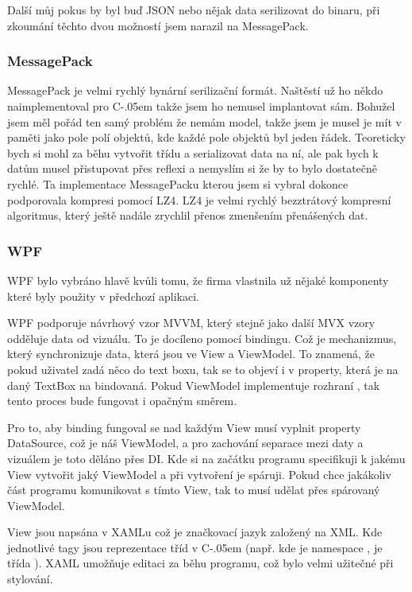 \documentclass[czech,bachelor,dept460,male,csharp]{diploma}
\newcommand{\Csharp}{%
  {\settoheight{\dimen0}{C}C\kern-.05em \resizebox{!}{\dimen0}{\raisebox{\depth}{\#}}}}
\begin{document}
			Další můj pokus by byl buď JSON nebo nějak data serilizovat do binaru, při zkoumání těchto dvou možností jsem narazil na MessagePack. 
		\subsubsection{MessagePack}
			MessagePack\cite{mpSpec} je velmi rychlý bynární serilizační formát. Naštěstí už ho někdo naimplementoval pro {\Csharp} takže jsem ho nemusel implantovat sám. Bohužel jsem měl pořád ten samý problém že nemám model, takže jsem je musel je mít v paměti jako pole polí objektů, kde každé pole objektů byl jeden řádek. Teoreticky bych si mohl za běhu vytvořit třídu a serializovat data na ní, ale pak bych k datům musel přistupovat přes reflexi a nemyslím si že by to bylo dostatečně rychlé. Ta implementace MessagePacku\cite{mpImpl} kterou jsem si vybral dokonce podporovala kompresi pomocí LZ4. LZ4\cite{l4z} je velmi rychlý bezztrátový kompresní algoritmus, který ještě nadále zrychlil přenos zmenšením přenášených dat. 
 
		\subsubsection{WPF}
			WPF bylo vybráno hlavě kvůli tomu, že firma vlastnila už nějaké komponenty které byly použity v předchozí aplikaci.
			
			WPF podporuje návrhový vzor MVVM, který stejně jako další MVX vzory odděluje data od vizuálu. To je docíleno pomocí bindingu. Což je mechanizmus, který synchronizuje data, která jsou ve View a ViewModel. To znamená, že pokud uživatel zadá něco do text boxu, tak se to objeví i v property, která je na daný TextBox na bindovaná. Pokud ViewModel implementuje rozhraní , tak tento proces bude fungovat i opačným směrem.
			
			Pro to, aby binding fungoval se nad každým View musí vyplnit property DataSource, což je náš ViewModel, a pro zachování separace mezi daty a vizuálem je toto děláno přes DI. Kde si na začátku programu specifikuji k jakému View vytvořit jaký ViewModel a při vytvoření je spáruji. Pokud chce jakákoliv část programu komunikovat s tímto View, tak to musí udělat přes spárovaný ViewModel.
			
			View jsou napsána v XAMLu což je značkovací jazyk založený na XML. Kde jednotlivé tagy jsou reprezentace tříd v {\Csharp} (např.  kde  je namespace , je třída  ). XAML umožňuje editaci za běhu programu, což bylo velmi užitečné při stylování. 
			
\end{document}
